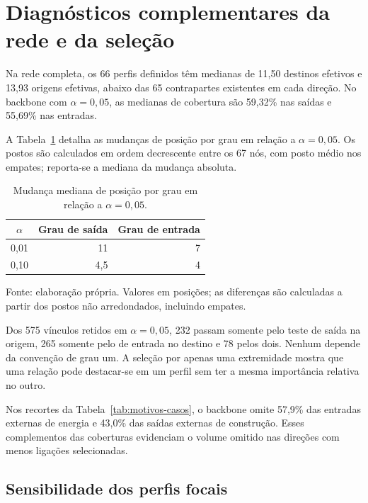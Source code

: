 \section{Diagnósticos complementares da rede e da seleção}
\label{anexo:diagnosticos}

Na rede completa, os 66 perfis definidos têm medianas de 11,50 destinos efetivos e 13,93 origens efetivas, abaixo das 65 contrapartes existentes em cada direção. No backbone com $\alpha=0{,}05$, as medianas de cobertura são 59,32\% nas saídas e 55,69\% nas entradas.

A Tabela~\ref{tab:postos-complementares} detalha as mudanças de posição por grau em relação a $\alpha=0{,}05$. Os postos são calculados em ordem decrescente entre os 67 nós, com posto médio nos empates; reporta-se a mediana da mudança absoluta.

\begin{table}[htbp]
\centering
\caption{Mudança mediana de posição por grau em relação a $\alpha=0{,}05$.}
\label{tab:postos-complementares}
\begin{tabular}{@{}crr@{}}
\toprule
$\alpha$ & Grau de saída & Grau de entrada \\
\midrule
0,01 & 11 & 7 \\
0,10 & 4,5 & 4 \\
\bottomrule
\end{tabular}
\par\smallskip\begin{minipage}{\textwidth}\footnotesize
Fonte: elaboração própria. Valores em posições; as diferenças são calculadas a partir dos postos não arredondados, incluindo empates.
\end{minipage}
\end{table}

Dos 575 vínculos retidos em $\alpha=0{,}05$, 232 passam somente pelo teste de saída na origem, 265 somente pelo de entrada no destino e 78 pelos dois. Nenhum depende da convenção de grau um. A seleção por apenas uma extremidade mostra que uma relação pode destacar-se em um perfil sem ter a mesma importância relativa no outro.

Nos recortes da Tabela~\ref{tab:motivos-casos}, o backbone omite 57,9\% das entradas externas de energia e 43,0\% das saídas externas de construção. Esses complementos das coberturas evidenciam o volume omitido nas direções com menos ligações selecionadas.


\subsection{Sensibilidade dos perfis focais}

